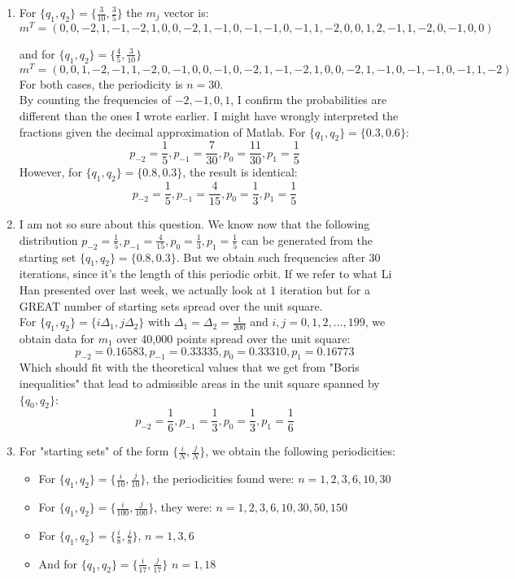 \begin{description}
{\begin{enumerate}
\item
    For $\{q_1, q_2\} = \{\frac{3}{10}, \frac{3}{5}\}$ the $m_j$ vector is:
    \[
    m^T = (0,0,-2,1,-1,-2,1,0,0,-2,1,-1,0,-1,-1,0,-1,1,-2,0,0,1,2,-1,1,-2,0,-1,0,0)
    \]

    and for $\{q_1, q_2\} = \{\frac{4}{5}, \frac{3}{10}\}$
    \[
m^T =  (0,0,1,-2,-1,1,-2,0,-1,0,0,-1,0,-2,1,-1,-2,1,0,0,-2,1,-1,0,-1,-1,0,-1,1,-2)
   \]
For both cases, the periodicity is $n = 30$.\\
By counting the frequencies of $-2,-1,0,1$, I confirm the probabilities are different than the ones I wrote earlier. I might have wrongly interpreted the fractions given the decimal approximation of Matlab. For $\{q_1, q_2\} = \{0.3, 0.6\}$:
    \[
    p_{-2} = \frac{1}{5}, p_{-1} = \frac{7}{30}, p_{0} = \frac{11}{30}, p_{1} = \frac{1}{5}
       \]
   However, for $\{q_1, q_2\} = \{0.8, 0.3\}$, the result is identical:
    \[
    p_{-2} =\frac{1}{5}, p_{-1} =  \frac{4}{15}, p_{0} =\frac{1}{3}, p_{1} = \frac{1}{5}
    \]

\item
I am not so sure about this question. We know now that the following distribution $p_{-2} =\frac{1}{5}, p_{-1} =  \frac{4}{15}, p_{0} =\frac{1}{3}, p_{1} = \frac{1}{5}$ can be generated from the starting set $\{q_1, q_2\} = \{0.8, 0.3\}$. But we obtain such frequencies after 30 iterations, since it's the length of this periodic orbit. If we refer to what Li Han presented over last week, we actually look at 1 iteration but for a GREAT number of starting sets spread over the unit square.\\
For $\{q_1, q_2\} = \{ i\Delta_1, j\Delta_2\}$ with $\Delta_1 = \Delta_2 = \frac{1}{200}$ and $i, j = 0, 1, 2, \dots, 199$, we obtain data for $m_1$ over 40,000 points spread over the unit square:
\[
p_{-2} =0.16583, p_{-1} = 0.33335, p_{0} =0.33310, p_{1} = 0.16773
\]
Which should fit with the theoretical values that we get from "Boris inequalities" that lead to admissible areas in the unit square spanned by $\{q_0, q_2\}$:
\[
p_{-2} =\frac{1}{6}, p_{-1} =  \frac{1}{3}, p_{0} =\frac{1}{3}, p_{1} = \frac{1}{6}
\]

\item
For "starting sets" of the form $\{\frac{i}{N}, \frac{j}{N} \}$, we obtain the following periodicities:




	\begin {itemize}
	\item
	For $\{q_1, q_2\} = \{\frac{i}{10},\frac{j}{10}\}$, the periodicities found were: $n = 1, 2, 3, 6, 10, 30$
  	\item
	For $\{q_1, q_2\} = \{\frac{i}{100},\frac{j}{100}\}$, they were: $n = 1, 2, 3, 6, 10, 30, 50, 150$
  	\item
	For $\{q_1, q_2\} = \{\frac{i}{8},\frac{j}{8}\}$, $n = 1, 3, 6$
  	\item
	And for $\{q_1, q_2\} = \{\frac{i}{17},\frac{j}{17}\}$ $n = 1, 18$
	\end {itemize}



\end{enumerate}}
\end{description}
